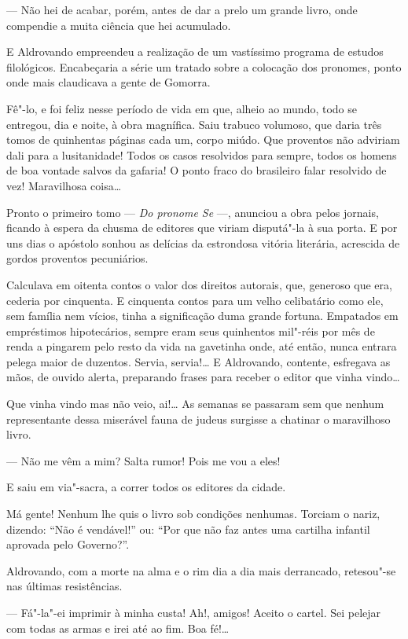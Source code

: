 --- Não hei de acabar, porém, antes de dar a prelo um grande livro, onde
compendie a muita ciência que hei acumulado.

E Aldrovando empreendeu a realização de um vastíssimo programa de
estudos filológicos. Encabeçaria a série um tratado sobre a colocação
dos pronomes, ponto onde mais claudicava a gente de Gomorra.

Fê"-lo, e foi feliz nesse período de vida em que, alheio ao mundo, todo
se entregou, dia e noite, à obra magnífica. Saiu trabuco volumoso, que
daria três tomos de quinhentas páginas cada um, corpo miúdo. Que
proventos não adviriam dali para a lusitanidade! Todos os casos
resolvidos para sempre, todos os homens de boa vontade salvos da
gafaria! O ponto fraco do brasileiro falar resolvido de vez! Maravilhosa
coisa\ldots{}

Pronto o primeiro tomo --- \emph{Do pronome Se} ---, anunciou a obra
pelos jornais, ficando à espera da chusma de editores que viriam
disputá"-la à sua porta. E por uns dias o apóstolo sonhou as delícias da
estrondosa vitória literária, acrescida de gordos proventos pecuniários.

Calculava em oitenta contos o valor dos direitos autorais, que, generoso
que era, cederia por cinquenta. E cinquenta contos para um velho
celibatário como ele, sem família nem vícios, tinha a significação duma
grande fortuna. Empatados em empréstimos hipotecários, sempre eram seus
quinhentos mil"-réis por mês de renda a pingarem pelo resto da vida na
gavetinha onde, até então, nunca entrara pelega maior de duzentos.
Servia, servia!\ldots{} E Aldrovando, contente, esfregava as mãos, de ouvido
alerta, preparando frases para receber o editor que vinha vindo\ldots{}

Que vinha vindo mas não veio, ai!\ldots{} As semanas se passaram sem que
nenhum representante dessa miserável fauna de judeus surgisse a chatinar
o maravilhoso livro.

--- Não me vêm a mim? Salta rumor! Pois me vou a eles!

E saiu em via"-sacra, a correr todos os editores da cidade.

Má gente! Nenhum lhe quis o livro sob condições nenhumas. Torciam o
nariz, dizendo: ``Não é vendável!'' ou: ``Por que não faz antes uma
cartilha infantil aprovada pelo Governo?''.

Aldrovando, com a morte na alma e o rim dia a dia mais derrancado,
retesou"-se nas últimas resistências.

--- Fá"-la"-ei imprimir à minha custa! Ah!, amigos! Aceito o cartel. Sei
pelejar com todas as armas e irei até ao fim. Boa fé!\ldots{}

